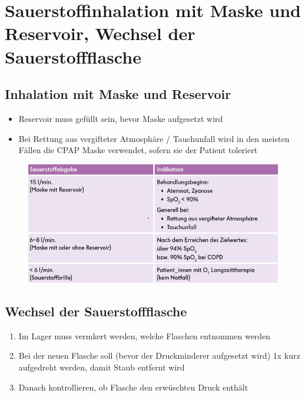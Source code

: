 \chapter{Sauerstoffinhalation mit Maske und Reservoir, Wechsel der Sauerstoffflasche}
\section{Inhalation mit Maske und Reservoir}
\begin{itemize}
    \item Reservoir muss gefüllt sein, bevor Maske aufgesetzt wird
    \item Bei Rettung aus vergifteter Atmosphäre / Tauchunfall wird in den meisten Fällen die CPAP Maske verwendet, sofern sie der Patient toleriert
\end{itemize}
\begin{figure}[H]
    \centering
    \includegraphics[width=\textwidth]{res/sauerstoff.png}
\end{figure}
\section{Wechsel der Sauerstoffflasche}
\begin{enumerate}
    \item Im Lager muss vermkert werden, welche Flaschen entnommen werden
    \item Bei der neuen Flasche soll (bevor der Druckminderer aufgesetzt wird) 1x kurz aufgedreht werden, damit Staub entfernt wird
    \item Danach kontrollieren, ob Flasche den erwüschten Druck enthält
\end{enumerate}